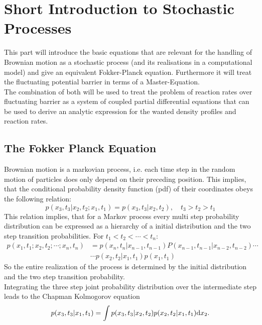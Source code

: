 \section{Short Introduction to Stochastic Processes}
This part will introduce the basic equations that are relevant for the handling of Brownian motion as a stochastic process (and its realisations in a computational model) and give an equivalent Fokker-Planck equation. Furthermore it will treat the fluctuating potential barrier in terms of a Master-Equation. \\
The combination of both will be used to treat the problem of reaction rates over fluctuating barrier as a system of coupled partial differential equations that can be used to derive an analytic expression for the wanted density profiles and reaction rates.
\subsection{The Fokker Planck Equation}
\label{fpeq}
Brownian motion is a markovian process, i.e. each time step in the random motion of particles does only depend on their preceding position. This implies, that the conditional probability density function (pdf) of their coordinates obeys the following relation:
\begin{equation}
    p(x_{3},t_{3}|x_{2},t_{2};x_{1},t_{1}) = p(x_{3},t_{3}|x_{2},t_{2}), \quad t_{3}>t_{2}>t_{1}
    \label{}
\end{equation}
This relation implies, that for a Markov process every multi step probability distribution can be expressed as a hierarchy of a initial distribution and the two step transition probabilities. For $ t_1 < t_2 < \cdots < t_n$:
\begin{align}
    p(x_1,t_1;x_2,t_2;\cdots;x_n,t_n) &= p(x_n,t_n|x_{n-1},t_{n-1})P(x_{n-1},t_{n-1}|x_{n-2},t_{n-2}) \cdots \nonumber \\
                                      & \cdots p(x_2,t_2|x_1,t_1)p(x_1,t_1)
    \label{hierarchy}
\end{align}
So the entire realization of the process is determined by the initial distribution and the two step transition probability. \\
Integrating the three step joint probability distribution over the intermediate step leads to the Chapman Kolmogorov equation
\begin{equation}
    p(x_3,t_3|x_1,t_1) = \int p(x_3,t_3|x_2,t_2) p(x_2,t_2|x_1,t_1) {\rm d} x_2.
    \label{Chapman Kolmogorov equation}
\end{equation}
